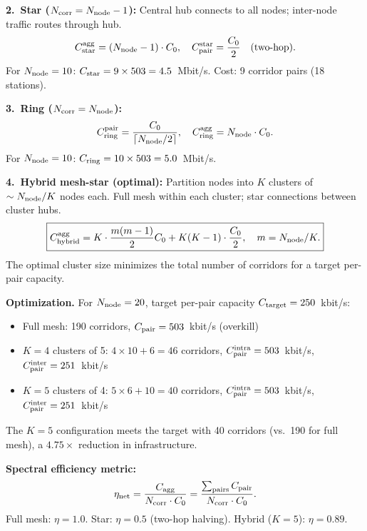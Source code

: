 \documentclass[aps,prd,twocolumn,superscriptaddress,nofootinbib]{revtex4-2}
\begin{document}
\textbf{2.\ Star ($N_{\rm corr} = N_{\rm node}-1$):}
Central hub connects to all nodes; inter-node traffic routes through hub.
\begin{equation}
C_{\rm star}^{\rm agg} = (N_{\rm node}-1)\cdot C_0,
\quad C_{\rm pair}^{\rm star} = \frac{C_0}{2}
\quad\text{(two-hop)}.
\end{equation}
For $N_{\rm node} = 10$: $C_{\rm star} = 9\times 503 = 4.5$~Mbit/s.
Cost: 9 corridor pairs (18 stations).

\textbf{3.\ Ring ($N_{\rm corr} = N_{\rm node}$):}
\begin{equation}
C_{\rm ring}^{\rm pair} = \frac{C_0}{\lceil N_{\rm node}/2\rceil},
\quad C_{\rm ring}^{\rm agg} = N_{\rm node}\cdot C_0.
\end{equation}
For $N_{\rm node} = 10$: $C_{\rm ring} = 10\times 503 = 5.0$~Mbit/s.

\textbf{4.\ Hybrid mesh-star (optimal):}
Partition nodes into $K$ clusters of $\sim N_{\rm node}/K$ nodes each.
Full mesh within each cluster; star connections between cluster hubs.
\begin{equation}
\boxed{
C_{\rm hybrid}^{\rm agg} = K\cdot\frac{m(m-1)}{2}C_0
+ K(K-1)\cdot\frac{C_0}{2},
\quad m = N_{\rm node}/K.
}
\label{eq:hybrid-topo}
\end{equation}
The optimal cluster size minimizes the total number of corridors for
a target per-pair capacity.

\textbf{Optimization.}  For $N_{\rm node} = 20$, target per-pair
capacity $C_{\rm target} = 250$~kbit/s:
\begin{itemize}
\item Full mesh: 190 corridors, $C_{\rm pair} = 503$~kbit/s (overkill)
\item $K = 4$ clusters of 5: $4\times10 + 6 = 46$ corridors,
$C_{\rm pair}^{\rm intra} = 503$~kbit/s,
$C_{\rm pair}^{\rm inter} = 251$~kbit/s
\item $K = 5$ clusters of 4: $5\times6+10 = 40$ corridors,
$C_{\rm pair}^{\rm intra} = 503$~kbit/s,
$C_{\rm pair}^{\rm inter} = 251$~kbit/s
\end{itemize}

The $K=5$ configuration meets the target with 40 corridors (vs.\ 190
for full mesh), a $4.75\times$ reduction in infrastructure.

\textbf{Spectral efficiency metric:}
\begin{equation}
\eta_{\rm net} = \frac{C_{\rm agg}}{N_{\rm corr}\cdot C_0}
= \frac{\sum_{\rm pairs}C_{\rm pair}}
{N_{\rm corr}\cdot C_0}.
\end{equation}
Full mesh: $\eta = 1.0$. Star: $\eta = 0.5$ (two-hop halving).
Hybrid ($K=5$): $\eta = 0.89$.
\end{document}
